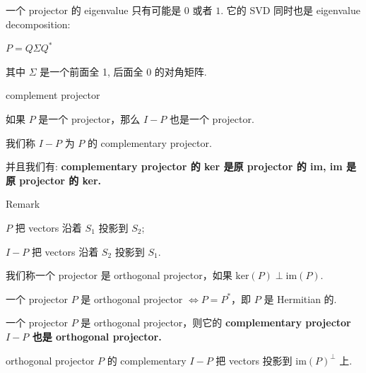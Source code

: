 \begin{lemma}

一个 projector 的 eigenvalue 只有可能是 \(0\) 或者 \(1\). 它的 SVD 同时也是 eigenvalue decomposition:

\(P = Q\Sigma Q^{\ast}\)

其中 \(\Sigma\) 是一个前面全 1, 后面全 0 的对角矩阵.

\end{lemma}

\begin{lemma}{complement projector}

如果 \(P\) 是一个 projector，那么 \(I - P\) 也是一个 projector.

我们称 \(I - P\) 为 \(P\) 的 complementary projector.

并且我们有: \textbf{complementary projector 的 ker 是原 projector 的 im, im 是原 projector 的 ker.}

\end{lemma}

\begin{qlremark}{Remark}

\(P\) 把 vectors 沿着 \(S_{1}\) 投影到 \(S_{2}\);

\(I - P\) 把 vectors 沿着 \(S_{2}\) 投影到 \(S_{1}\).

\end{qlremark}

\begin{definition}{}

我们称一个 projector 是 orthogonal projector，如果 \(\text{ker}(P) \perp \text{im}(P)\).

\end{definition}

\begin{theorem}

一个 projector \(P\) 是 orthogonal projector \(\Leftrightarrow P = P^{\ast}\)，即 \(P\) 是 Hermitian 的.

\end{theorem}

\begin{theorem}

一个 projector \(P\) 是 orthogonal projector，则它的 \textbf{complementary projector \(I - P\) 也是 orthogonal projector.}

\end{theorem}

\begin{corollary}

orthogonal projector \(P\) 的 complementary \(I - P\) 把 vectors 投影到 \({\text{im}(P)}^{\perp}\) 上.

\end{corollary}

